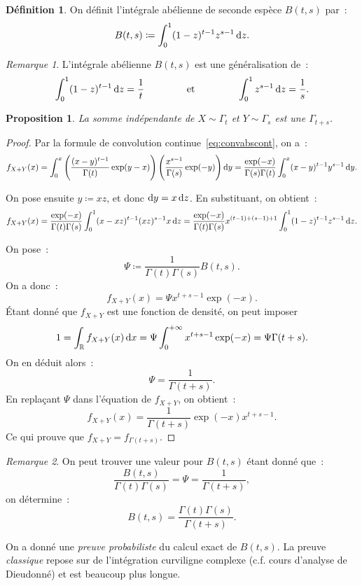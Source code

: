 \documentclass{article}
\newcommand{\R}{\mathbb R}
\newtheorem{prp}[thm]{Proposition}
\theoremstyle{definition}
\newtheorem{déf}[thm]{Définition}
\theoremstyle{remark}
\newtheorem*{rmq}{Remarque}
\begin{document}
		\begin{déf} On définit l'intégrale abélienne de seconde espèce $B(t, s)$ par~:
		\[B(t, s) \coloneqq \int_0^1(1-z)^{t-1}z^{s-1}\dif z.\]
		\end{déf}

		\begin{rmq} L'intégrale abélienne $B(t, s)$ est une généralisation de~:
		\[\int_0^1(1-z)^{t-1}\dif z = \frac 1t\qquad\qquad\text{ et }\qquad\qquad\int_0^1z^{s-1}\dif z = \frac 1s.\]
		\end{rmq}

		\begin{prp} La somme indépendante de $X \sim \Gamma_t$ et $Y \sim \Gamma_s$ est une $\Gamma_{t+s}$. \end{prp}

		\begin{proof} Par la formule de convolution continue~\eqref{eq:convabscont}, on a~:
		\[f_{X+Y}(x) = \int_0^x\left(\frac {(x-y)^{t-1}}{\Gamma(t)}\exp(y-x)\right) \left(\frac {x^{s-1}}{\Gamma(s)}\exp(-y)\right)\dif y
		= \frac {\exp(-x)}{\Gamma(s)\Gamma(t)}\int_0^x(x-y)^{t-1}y^{s-1}\dif y.\]

		On pose ensuite $y \coloneqq xz$, et donc $\dif y = x \dif z$. En substituant, on obtient~:
		\[f_{X+Y}(x) = \frac {\exp(-x)}{\Gamma(t)\Gamma(s)}\int_0^1(x-xz)^{t-1}(xz)^{s-1}x\dif z = \frac {\exp(-x)}{\Gamma(t)\Gamma(s)}x^{(t-1)+(s-1)+1}\int_0^1(1-z)^{t-1}z^{s-1}\dif z.\]

		On pose~:
		\[\Psi \coloneqq \frac 1{\Gamma(t)\Gamma(s)}B(t, s).\]
		On a donc~:
		\[f_{X+Y}(x) = \Psi x^{t+s-1}\exp(-x).\]
		Étant donné que $f_{X+Y}$ est une fonction de densité, on peut imposer~
		\[1 = \int_\R f_{X+Y}(x)\dif x = \Psi \int_0^{+\infty}x^{t+s-1}\exp(-x) = \Psi \Gamma(t+s).\]
		On en déduit alors~:
		\[\Psi = \frac 1{\Gamma(t+s)}.\]
		En replaçant $\Psi$ dans l'équation de $f_{X+Y}$, on obtient~:
		\[f_{X+Y}(x) = \frac 1{\Gamma(t+s)}\exp(-x)x^{t+s-1}.\]
		Ce qui prouve que $f_{X+Y} = f_{\Gamma(t+s)}$.
		\end{proof}

		\begin{rmq} On peut trouver une valeur pour $B(t, s)$ étant donné que~:
		\[\frac {B(t, s)}{\Gamma(t)\Gamma(s)} = \Psi = \frac 1{\Gamma(t+s)},\]
		on détermine~:
		\[B(t, s) = \frac {\Gamma(t)\Gamma(s)}{\Gamma(t+s)}.\]

		On a donné une \emph{preuve probabiliste} du calcul exact de $B(t, s)$. La preuve \emph{classique} repose sur de l'intégration curviligne complexe
		(c.f. cours d'analyse de Dieudonné) et est beaucoup plus longue.
		\end{rmq}
\end{document}
